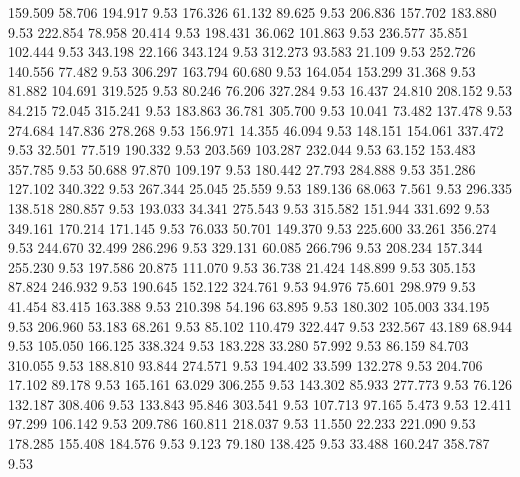  159.509   58.706  194.917         9.53
 176.326   61.132   89.625         9.53
 206.836  157.702  183.880         9.53
 222.854   78.958   20.414         9.53
 198.431   36.062  101.863         9.53
 236.577   35.851  102.444         9.53
 343.198   22.166  343.124         9.53
 312.273   93.583   21.109         9.53
 252.726  140.556   77.482         9.53
 306.297  163.794   60.680         9.53
 164.054  153.299   31.368         9.53
  81.882  104.691  319.525         9.53
  80.246   76.206  327.284         9.53
  16.437   24.810  208.152         9.53
  84.215   72.045  315.241         9.53
 183.863   36.781  305.700         9.53
  10.041   73.482  137.478         9.53
 274.684  147.836  278.268         9.53
 156.971   14.355   46.094         9.53
 148.151  154.061  337.472         9.53
  32.501   77.519  190.332         9.53
 203.569  103.287  232.044         9.53
  63.152  153.483  357.785         9.53
  50.688   97.870  109.197         9.53
 180.442   27.793  284.888         9.53
 351.286  127.102  340.322         9.53
 267.344   25.045   25.559         9.53
 189.136   68.063    7.561         9.53
 296.335  138.518  280.857         9.53
 193.033   34.341  275.543         9.53
 315.582  151.944  331.692         9.53
 349.161  170.214  171.145         9.53
  76.033   50.701  149.370         9.53
 225.600   33.261  356.274         9.53
 244.670   32.499  286.296         9.53
 329.131   60.085  266.796         9.53
 208.234  157.344  255.230         9.53
 197.586   20.875  111.070         9.53
  36.738   21.424  148.899         9.53
 305.153   87.824  246.932         9.53
 190.645  152.122  324.761         9.53
  94.976   75.601  298.979         9.53
  41.454   83.415  163.388         9.53
 210.398   54.196   63.895         9.53
 180.302  105.003  334.195         9.53
 206.960   53.183   68.261         9.53
  85.102  110.479  322.447         9.53
 232.567   43.189   68.944         9.53
 105.050  166.125  338.324         9.53
 183.228   33.280   57.992         9.53
  86.159   84.703  310.055         9.53
 188.810   93.844  274.571         9.53
 194.402   33.599  132.278         9.53
 204.706   17.102   89.178         9.53
 165.161   63.029  306.255         9.53
 143.302   85.933  277.773         9.53
  76.126  132.187  308.406         9.53
 133.843   95.846  303.541         9.53
 107.713   97.165    5.473         9.53
  12.411   97.299  106.142         9.53
 209.786  160.811  218.037         9.53
  11.550   22.233  221.090         9.53
 178.285  155.408  184.576         9.53
   9.123   79.180  138.425         9.53
  33.488  160.247  358.787         9.53

